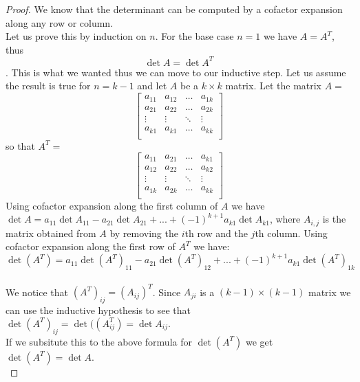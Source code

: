 \begin{proof}
  We know that the determinant can be computed by a cofactor expansion along any row or column. \\

  Let us prove this by induction on $n$. For the base case $n=1$ we have $A = A^T$, thus 
  $$\det A = \det A^T$$.  This is what we wanted thus we can move to our inductive step. Let us assume the result is true for $n = k-1$ and let $A$ be a $k \times k$ matrix.
  Let the matrix $A =$
  \[
  \begin{bmatrix}
     a_{11}  &   a_{12}  &   \hdots  & a_{1k} \\
     a_{21}  &   a_{22}  &   \hdots  & a_{2k} \\
        \vdots  &   \vdots  & \ddots & \vdots \\
    a_{k1}       &   a_{k1}     &   \hdots  & a_{kk} \\
  \end{bmatrix}\] so that 
  $A^T =$
  \[
  \begin{bmatrix}
     a_{11}  &   a_{21}  &   \hdots  & a_{k1} \\
     a_{12}  &   a_{22}  &   \hdots  & a_{k2} \\
        \vdots  &   \vdots  & \ddots & \vdots \\
    a_{1k}       &   a_{2k}     &   \hdots  & a_{kk} \\
  \end{bmatrix}\]
  Using cofactor expansion along the first column of $A$ we have\\ $\det A = a_{11} \det A_{11}-a_{21} \det A_{21}+ ... +(-1)^{k+1}a_{k1}\det A_{k1}$, where $A_{i,j}$ is the matrix obtained from $A$ by removing the $i$th row and the $j$th column. Using cofactor expansion along the first row of $A^T$ we have: \\
  $\det (A^T) = a_{11} \det (A^T)_{11}-a_{21} \det (A^T)_{12}+ ... +(-1)^{k+1}a_{k1}\det (A^T)_{1k}$ \\\\
  We notice that $(A^T)_{ij}=(A_{ij})^T$. Since $A_{ji}$ is a $(k-1) \times (k-1)$ matrix we can use the inductive hypothesis to see that\\
  $\det (A^T)_{ij} = \det((A_{ij}^T)= \det A_{ij}.$ \\

  If we subsitute this to the above formula for $\det(A^T)$ we get \\
  $\det(A^T)= \det A$. \\
\end{proof}
